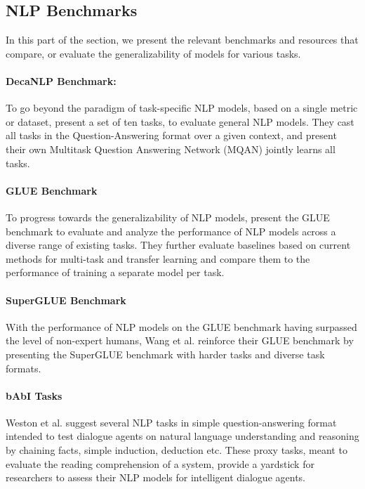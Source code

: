\documentclass[sigplan,review,anonymous]{acmart}\settopmatter{printfolios=true,printccs=false,printacmref=false}
\begin{document}
\subsection{NLP Benchmarks}
In this part of the section, we present the relevant benchmarks and resources that compare, or evaluate the generalizability of models for various tasks. 

\paragraph*{DecaNLP Benchmark:} To go beyond the paradigm of task-specific NLP models, based on a single metric or dataset, \citet{DBLP:journals/corr/abs-1806-08730} present a set of ten tasks, to evaluate general NLP models. They cast all tasks in the Question-Answering format over a given context, and present their own Multitask Question Answering Network (MQAN) jointly learns all tasks. 

\paragraph*{GLUE Benchmark} To progress towards the generalizability of NLP models, \citet{DBLP:journals/corr/abs-1804-07461} present the GLUE benchmark to evaluate and analyze the performance of NLP models across a diverse range of existing tasks. They further evaluate baselines based on current methods for multi-task and transfer learning and compare them to the performance of training a separate model per task.

\paragraph*{SuperGLUE Benchmark} With the performance of NLP models on the GLUE benchmark having surpassed the level of non-expert
humans, Wang et al. \cite{DBLP:journals/corr/abs-1905-00537} reinforce their GLUE benchmark by presenting the SuperGLUE benchmark with harder tasks and diverse task formats. 

\paragraph*{bAbI Tasks} Weston et al. \cite{weston2015towards} suggest several NLP tasks in simple question-answering format intended to test dialogue agents on natural language understanding and reasoning by chaining facts, simple induction, deduction etc. These proxy tasks, meant to evaluate the reading comprehension of a system, provide a yardstick for researchers to assess their NLP models for intelligent dialogue agents. 
\end{document}
